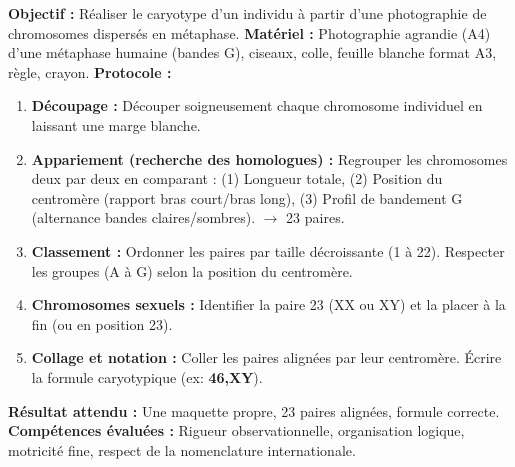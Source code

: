 \documentclass[11pt]{article}
\begin{document}
\begin{experience}
\textbf{Objectif :} Réaliser le caryotype d'un individu à partir d'une photographie de chromosomes dispersés en métaphase.
\textbf{Matériel :} Photographie agrandie (A4) d'une métaphase humaine (bandes G), ciseaux, colle, feuille blanche format A3, règle, crayon.
\textbf{Protocole :}
\begin{enumerate}
    \item \textbf{Découpage :} Découper soigneusement chaque chromosome individuel en laissant une marge blanche.
    \item \textbf{Appariement (recherche des homologues) :} Regrouper les chromosomes deux par deux en comparant : (1) Longueur totale, (2) Position du centromère (rapport bras court/bras long), (3) Profil de bandement G (alternance bandes claires/sombres). $\rightarrow$ 23 paires.
    \item \textbf{Classement :} Ordonner les paires par taille décroissante (1 à 22). Respecter les groupes (A à G) selon la position du centromère.
    \item \textbf{Chromosomes sexuels :} Identifier la paire 23 (XX ou XY) et la placer à la fin (ou en position 23).
    \item \textbf{Collage et notation :} Coller les paires alignées par leur centromère. Écrire la formule caryotypique (ex: \textbf{46,XY}).
\end{enumerate}
\textbf{Résultat attendu :} Une maquette propre, 23 paires alignées, formule correcte.
\textbf{Compétences évaluées :} Rigueur observationnelle, organisation logique, motricité fine, respect de la nomenclature internationale.
\end{experience}
\end{document}
